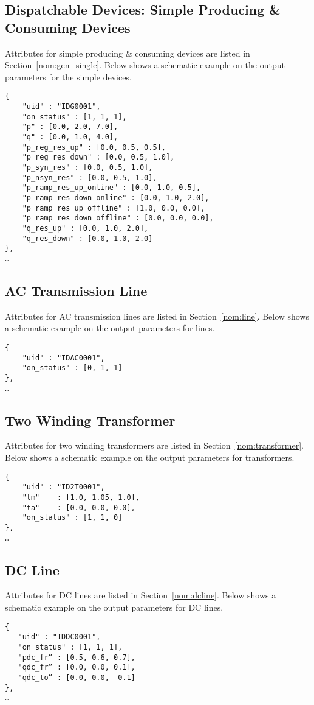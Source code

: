\subsection{Dispatchable Devices: Simple Producing \& Consuming Devices}
Attributes for simple producing \& consuming devices are listed in Section~\ref{nom:gen_single}.
Below shows a schematic example on the output parameters for the simple devices.

\begin{verbatim}
{
    "uid" : "IDG0001",
    "on_status" : [1, 1, 1],
    "p" : [0.0, 2.0, 7.0],
    "q" : [0.0, 1.0, 4.0],
    "p_reg_res_up" : [0.0, 0.5, 0.5],
    "p_reg_res_down" : [0.0, 0.5, 1.0],
    "p_syn_res" : [0.0, 0.5, 1.0],
    "p_nsyn_res" : [0.0, 0.5, 1.0],
    "p_ramp_res_up_online" : [0.0, 1.0, 0.5],
    "p_ramp_res_down_online" : [0.0, 1.0, 2.0],
    "p_ramp_res_up_offline" : [1.0, 0.0, 0.0],
    "p_ramp_res_down_offline" : [0.0, 0.0, 0.0],
    "q_res_up" : [0.0, 1.0, 2.0],
    "q_res_down" : [0.0, 1.0, 2.0]
},
…     
\end{verbatim}

\subsection{AC Transmission Line}
Attributes for AC transmission lines are listed in Section~\ref{nom:line}.
Below shows a schematic example on the output parameters for lines.

\begin{verbatim}
{
    "uid" : "IDAC0001",
    "on_status" : [0, 1, 1]
},
…     
\end{verbatim}



\subsection{Two Winding Transformer}
Attributes for two winding transformers are listed in Section~\ref{nom:transformer}.
Below shows a schematic example on the output parameters for transformers.

\begin{verbatim}
{
    "uid" : "ID2T0001",
    "tm"    : [1.0, 1.05, 1.0],
    "ta"    : [0.0, 0.0, 0.0],
    "on_status" : [1, 1, 0]
},
…     
\end{verbatim}

\subsection{DC Line}
Attributes for DC lines are listed in Section~\ref{nom:dcline}.
Below shows a schematic example on the output parameters for DC lines.
\begin{verbatim}
{
   "uid" : "IDDC0001",
   "on_status" : [1, 1, 1],   
   "pdc_fr” : [0.5, 0.6, 0.7],
   "qdc_fr” : [0.0, 0.0, 0.1],
   "qdc_to” : [0.0, 0.0, -0.1]
},
…    
\end{verbatim}



